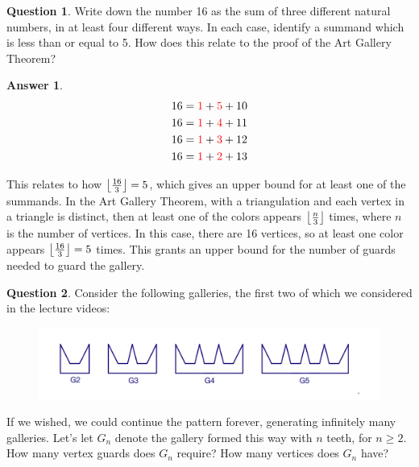 \documentclass[article, 12pt]{article}
\theoremstyle{definition}
\newtheorem{question}{Question}
\newtheorem{answer}{Answer}
\DeclarePairedDelimiter\floor{\lfloor}{\rfloor} %
\begin{document}
    \begin{question}
        Write down the number 16 as the sum of three different natural numbers, in at least four different ways. In each case, identify a summand which is less than or equal to 5. How does this relate to the proof of the Art Gallery Theorem?
    \end{question}
    \begin{answer}
        \begin{align*}
            16 &= \textcolor{red}{1} + \textcolor{red}{5} + 10 \\
            16 &= \textcolor{red}{1} + \textcolor{red}{4} + 11 \\
            16 &= \textcolor{red}{1} + \textcolor{red}{3} + 12 \\
            16 &= \textcolor{red}{1} + \textcolor{red}{2} + 13 \\
        \end{align*}

        This relates to how $\floor*{\frac{16}{3}} = 5$, which gives an upper bound for at least one of the summands. In the Art Gallery Theorem, with a triangulation and each vertex in a triangle is distinct, then at least one of the colors appears $\floor*{\frac{n}{3}}$ times, where $n$ is the number of vertices. In this case, there are 16 vertices, so at least one color appears $\floor*{\frac{16}{3}} = 5$ times. This grants an upper bound for the number of guards needed to guard the gallery.
    \end{answer}

    \begin{question}
        Consider the following galleries, the first two of which we considered in the lecture videos:
        \begin{figure}[H]
            \centering
            \includegraphics[width=\textwidth]{teeth.png}
        \end{figure}
        If we wished, we could continue the pattern forever, generating infinitely many galleries. Let's let $G_n$ denote the gallery formed this way with $n$ teeth, for $n \geq 2$. How many vertex guards does $G_n$ require? How many vertices does $G_n$ have?
    \end{question}
\end{document}
